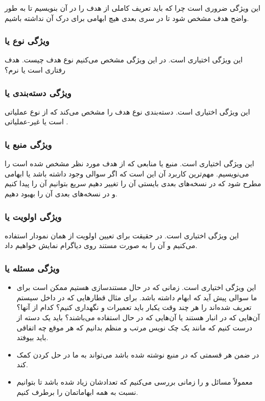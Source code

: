 این ویژگی ضروری است چرا که باید تعریف کاملی از هدف را در آن بنویسیم تا به طور
واضح هدف مشخص شود تا در سری بعدی هیچ ابهامی برای درک آن نداشته باشیم.

\subsubsection{ویژگی نوع یا }

این ویژگی اختیاری است. در این ویژگی مشخص می‌کنیم نوع هدف چیست. هدف رفتاری است یا
نرم؟

\subsubsection{ویژگی دسته‌بندی یا }

این ویژگی اختیاری است. دسته‌بندی نوع هدف را مشخص می‌کند که از نوع عملیاتی
 است یا غیر-عملیاتی .

\subsubsection{ویژگی منبع یا }

این ویژگی اختیاری است. منبع یا منابعی که از هدف مورد نظر مشخص شده است را
می‌نویسیم. مهم‌ترین کاربرد آن این است که اگر سوالی وجود داشته باشد یا ابهامی
مطرح شود که در نسخه‌های بعدی بایستی آن را تغییر دهیم سریع بتوانیم آن را پیدا
کنیم و در نسخه‌های بعدی آن را بهبود دهیم.

\subsubsection{ویژگی اولویت یا }

این ویژگی اختیاری است. در حقیقت برای تعیین اولویت از همان نمودار 
استفاده می‌کنیم و آن را به صورت مستند روی دیاگرام نمایش خواهیم داد.

\subsubsection{ویژگی مسئله یا }

\begin{itemize}
    \item این ویژگی اختیاری است. زمانی که در حال مستندسازی هستیم ممکن است برای
    ما سوالی پیش آید که ابهام داشته باشد. برای مثال قطار‌هایی که در داخل سیستم
    تعریف شده‌اند را هر چند وقت یکبار باید تعمیرات و نگهداری کنیم؟ کدام از آنها؟
    آن‌هایی که در انبار هستند یا آن‌هایی که در حال استفاده می‌باشند؟ باید یک
    دسته از  درست کنیم که مانند یک چک نویس مرتب و منظم بدانیم که هر
    موقع چه اتفاقی باید بیوفتد.
    \item در ضمن هر قسمتی که در منبع نوشته شده باشد می‌تواند به ما در حل کردن
     کمک کند.
    \item معمولاً مسائل و  را زمانی بررسی می‌کنیم که تعدادشان زیاد شده
    باشد تا بتوانیم نسبت به همه ابهاماتمان را برطرف کنیم.
\end{itemize}

